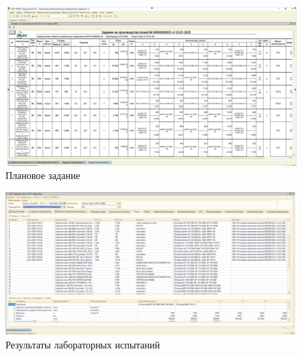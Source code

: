 \clearpage
\begin{figure}
\begin{center}
 \includegraphics[height=0.45\textheight, angle=90, keepaspectratio]{Pics/VIIIзадание.png}
\end{center}
 \caption{Плановое задание}
 \label{pic:/VIIIзадание}
\end{figure}

\begin{figure}
\begin{center}
 \includegraphics[height=0.45\textheight, angle=90, keepaspectratio]{Pics/VIIIрезультатыиспытаний.png}
\end{center}
 \caption{Результаты лабораторных испытаний}
 \label{pic:/VIIIрезультатыиспытаний}
\end{figure}

